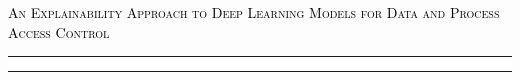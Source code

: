 \begin{center}
\chaptitlefont %
\begin{center}\textcolor{black}{\textsc{An Explainability Approach to Deep Learning Models for Data and Process Access Control}}
\end{center}
\end{center}
\vspace{8mm}
\textcolor{black}{\hrule height 4.5pt}%
\vspace{1mm}
\textcolor{black}{\hrule height 1.5pt}